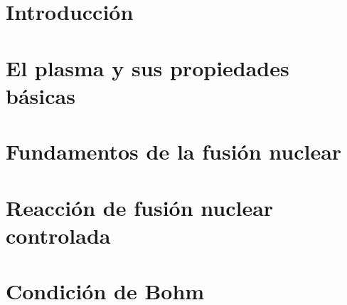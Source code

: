 \documentclass[a4paper,oneside,openright,12pt]{book}
\begin{document}
\chapter{Introducción}\label{cap.intro}
    


\chapter{El plasma y sus propiedades básicas}
	
	


\chapter{Fundamentos de la fusión nuclear}
	
	 


\chapter{Reacción de fusión nuclear controlada}

    
    

\chapter{Condición de Bohm}
	
\end{document}
